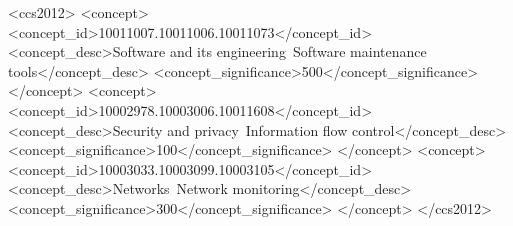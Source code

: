 \documentclass[sigconf,10pt]{acmart}
\begin{document}

\begin{CCSXML}
<ccs2012>
   <concept>
       <concept_id>10011007.10011006.10011073</concept_id>
       <concept_desc>Software and its engineering~Software maintenance tools</concept_desc>
       <concept_significance>500</concept_significance>
       </concept>
   <concept>
       <concept_id>10002978.10003006.10011608</concept_id>
       <concept_desc>Security and privacy~Information flow control</concept_desc>
       <concept_significance>100</concept_significance>
       </concept>
   <concept>
       <concept_id>10003033.10003099.10003105</concept_id>
       <concept_desc>Networks~Network monitoring</concept_desc>
       <concept_significance>300</concept_significance>
       </concept>
 </ccs2012>
\end{CCSXML}







\maketitle
\pagestyle{plain}












\end{document}
